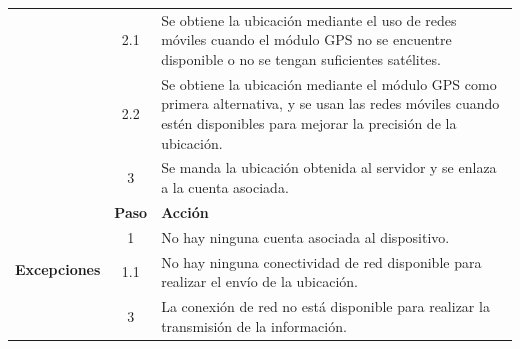 \begin{table}[H]
\begin{tabularx}{\textwidth}{|c|c|X|}
    \cline{2-3}
                                                & 2.1                                                                                              & \multicolumn{1}{L|}{Se obtiene la ubicación mediante el uso de redes móviles cuando el módulo GPS no se encuentre disponible o no se tengan suficientes satélites.}                           \\
    \cline{2-3}
                                                & 2.2                                                                                              & \multicolumn{1}{L|}{Se obtiene la ubicación mediante el módulo GPS como primera alternativa, y se usan las redes móviles cuando estén disponibles para mejorar la precisión de la ubicación.} \\
    \cline{2-3}
                                                & 3                                                                                                & \multicolumn{1}{L|}{Se manda la ubicación obtenida al servidor y se enlaza a la cuenta asociada.}                                                                                             \\
    \hline
    \multirow{6}{*}{\textbf{Excepciones}}       & \textbf{Paso}                                                                                    & \textbf{Acción}                                                                                                                                                                               \\
    \cline{2-3}
                                                & 1                                                                                                & \multicolumn{1}{L|}{No hay ninguna cuenta asociada al dispositivo.}                                                                                                                           \\
    \cline{2-3}
                                                & 1.1                                                                                              & \multicolumn{1}{L|}{No hay ninguna conectividad de red disponible para realizar el envío de la ubicación.}                                                                                    \\
    \cline{2-3}
                                                & 3                                                                                                & \multicolumn{1}{L|}{La conexión de red no está disponible para realizar la transmisión de la información.}                                                                                    \\
    \hline
  \end{tabularx}
\end{table}

